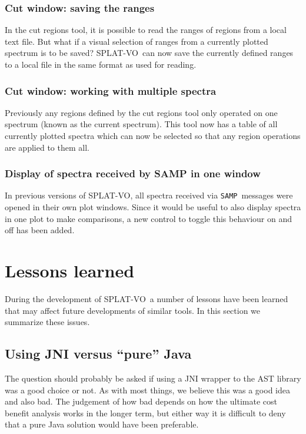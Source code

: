 \documentclass[final,authoryear,5p,times,twocolumn]{elsarticle}
\newcommand{\samp}{\texttt{SAMP}}
\newcommand{\splatvo}{{\textsf{\small{SPLAT-VO}}}}
\begin{document}
\subsubsection{Cut window: saving the ranges}
%
In the cut regions tool, it is possible to read the ranges of regions from a
local text file. But what if a visual selection of ranges from a currently
plotted spectrum is to be saved?  \splatvo\ can now save the currently
defined ranges to a local file in the same format as used for reading.

\subsubsection{Cut window: working with multiple spectra}
%
Previously any regions defined by the cut regions tool only operated on one
spectrum (known as the current spectrum). This tool now has a table of all
currently plotted spectra which can now be selected so that any region
operations are applied to them all.

\subsubsection{Display of spectra received by SAMP in one window}
%
In previous versions of \splatvo, all spectra received via \samp\ messages were
opened in their own plot windows. Since it would be useful to also display
spectra in one plot to make comparisons, a new control to toggle this behaviour
on and off has been added.

\section{Lessons learned}
%
During the development of \splatvo\ a number of lessons have been learned that
may affect future developments of similar tools. In this section we summarize
these issues.

\subsection{Using JNI versus ``pure'' Java}
\label{sec:jniast-lesson}
%
The question should probably be asked if using a JNI wrapper to the AST library
was a good choice or not. As with most things, we believe this was a good idea
and also bad. The judgement of how bad depends on how the ultimate cost benefit
analysis works in the longer term, but either way it is difficult to deny that
a pure Java solution would have been preferable.
\end{document}
